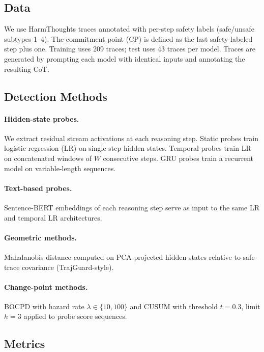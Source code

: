 \documentclass[11pt]{article}
\begin{document}
\subsection{Data}

We use HarmThoughts traces annotated with per-step safety labels (safe/unsafe subtypes 1--4). The commitment point (CP) is defined as the last safety-labeled step plus one. Training uses 209 traces; test uses 43 traces per model. Traces are generated by prompting each model with identical inputs and annotating the resulting CoT.

\subsection{Detection Methods}

\paragraph{Hidden-state probes.} We extract residual stream activations at each reasoning step. Static probes train logistic regression (LR) on single-step hidden states. Temporal probes train LR on concatenated windows of $W$ consecutive steps. GRU probes train a recurrent model on variable-length sequences.

\paragraph{Text-based probes.} Sentence-BERT embeddings of each reasoning step serve as input to the same LR and temporal LR architectures.

\paragraph{Geometric methods.} Mahalanobis distance computed on PCA-projected hidden states relative to safe-trace covariance (TrajGuard-style).

\paragraph{Change-point methods.} BOCPD with hazard rate $\lambda \in \{10, 100\}$ and CUSUM with threshold $t{=}0.3$, limit $h{=}3$ applied to probe score sequences.

\subsection{Metrics}
\end{document}
